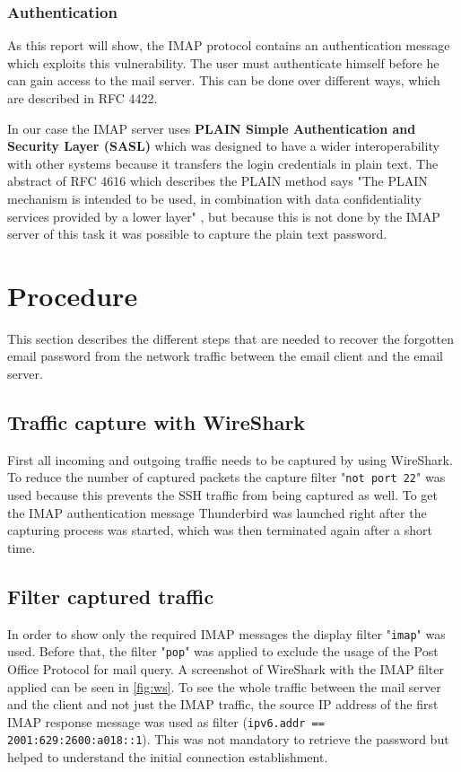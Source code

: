 \documentclass[parskip=full]{scrartcl}
\begin{document}
\subsubsection{Authentication}
As this report will show, the IMAP protocol contains an authentication message which exploits this vulnerability. 
The user must authenticate himself before he can gain access to the mail server. 
This can be done over different ways, which are described in RFC 4422.

In our case the IMAP server uses \textbf{PLAIN Simple Authentication and Security Layer (SASL)} which was designed to have a wider interoperability with other systems because it transfers the login credentials in plain text. The abstract of RFC 4616 which describes the PLAIN method says "The PLAIN mechanism is intended to be used, in combination with data confidentiality services provided by a lower
layer"\cite{zeilenga2006plain} , but because this is not done by the IMAP server of this task it was possible to capture the plain text password.


\section{Procedure} \label{sec:procedure}
This section describes the different steps that are needed to recover the forgotten email password from the network traffic between the email client and the email server. 
\subsection{Traffic capture with WireShark} \label{subsec:capture}
First all incoming and outgoing traffic needs to be captured by using WireShark. 
To reduce the number of captured packets the capture filter "\verb|not port 22|" was used because this prevents the SSH traffic from being captured as well. 
To get the IMAP authentication message Thunderbird was launched right after the capturing process was started, which was then terminated again after a short time.
\subsection{Filter captured traffic} \label{subsec:filter}
In order to show only the required IMAP messages the display filter "\verb|imap|" was used. 
Before that, the filter "\verb|pop|" was applied to exclude the usage of the Post Office Protocol for mail query. 
A screenshot of WireShark with the IMAP filter applied can be seen in \cref{fig:ws}. 
To see the whole traffic between the mail server and the client and not just the IMAP traffic, the source IP address of the first IMAP response message was used as filter (\verb|ipv6.addr == 2001:629:2600:a018::1|).
This was not mandatory to retrieve the password but helped to understand the initial connection establishment.  
\end{document}
